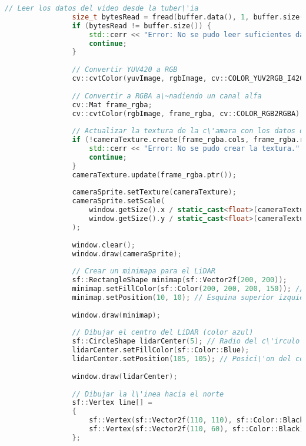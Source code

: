 \begin{lstlisting}[language={C++}, caption={Primera versi\'on del c\'odigo del sistema de control del robot}, label={PrimeraVersionCodigoRobot}]
                // Leer los datos del video desde la tuber\'ia
                size_t bytesRead = fread(buffer.data(), 1, buffer.size(), pipe);
                if (bytesRead != buffer.size()) {
                    std::cerr << "Error: No se pudo leer suficientes datos de video." << std::endl;
                    continue;
                }
        
                // Convertir YUV420 a RGB
                cv::cvtColor(yuvImage, rgbImage, cv::COLOR_YUV2RGB_I420);
        
                // Convertir a RGBA a\~nadiendo un canal alfa
                cv::Mat frame_rgba;
                cv::cvtColor(rgbImage, frame_rgba, cv::COLOR_RGB2RGBA);
        
                // Actualizar la textura de la c\'amara con los datos del frame
                if (!cameraTexture.create(frame_rgba.cols, frame_rgba.rows)) {
                    std::cerr << "Error: No se pudo crear la textura." << std::endl;
                    continue;
                }
                cameraTexture.update(frame_rgba.ptr());
        
                cameraSprite.setTexture(cameraTexture);
                cameraSprite.setScale(
                    window.getSize().x / static_cast<float>(cameraTexture.getSize().x),
                    window.getSize().y / static_cast<float>(cameraTexture.getSize().y)
                );
        
                window.clear();
                window.draw(cameraSprite);
        
                // Crear un minimapa para el LiDAR
                sf::RectangleShape minimap(sf::Vector2f(200, 200));
                minimap.setFillColor(sf::Color(200, 200, 200, 150)); // Fondo semitransparente
                minimap.setPosition(10, 10); // Esquina superior izquierda
        
                window.draw(minimap);
        
                // Dibujar el centro del LiDAR (color azul)
                sf::CircleShape lidarCenter(5); // Radio del c\'irculo del LiDAR
                lidarCenter.setFillColor(sf::Color::Blue);
                lidarCenter.setPosition(105, 105); // Posici\'on del centro en el minimapa
        
                window.draw(lidarCenter);
        
                // Dibujar la l\'inea hacia el norte
                sf::Vertex line[] =
                {
                    sf::Vertex(sf::Vector2f(110, 110), sf::Color::Black),
                    sf::Vertex(sf::Vector2f(110, 60), sf::Color::Black) // L\'inea hacia arriba (norte)
                };
        

\end{lstlisting}
